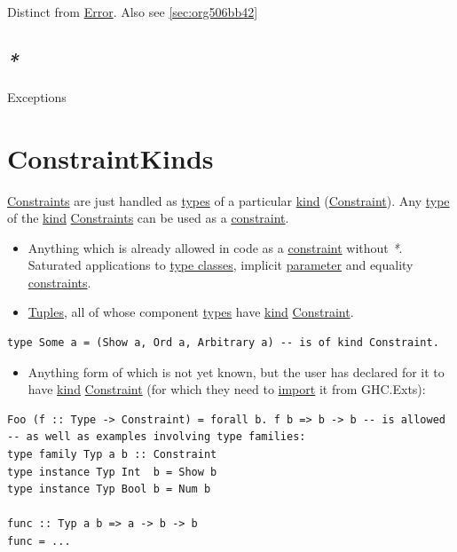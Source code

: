 \documentclass[a4paper,14pt,oneside]{book}
\begin{document}
Distinct from \hyperref[org5ce5059]{Error}. Also see \ref{sec:org506bb42}

\section{\emph{*}}
\label{sec:org059222b}

\label{org2242ef1}Exceptions

\chapter{\label{org9f13edb}ConstraintKinds}
\label{sec:org8cd489f}
\hyperref[org02cc92c]{Constraints} are just handled as \hyperref[orgfd19782]{types} of a particular \hyperref[org0d72dae]{kind} (\hyperref[org4cdc852]{Constraint}).
Any \hyperref[org1e4917d]{type} of the \hyperref[org0d72dae]{kind} \hyperref[org02cc92c]{Constraints} can be used as a \hyperref[org4cdc852]{constraint}.
\begin{itemize}
\item Anything which is already allowed in code as a \hyperref[org4cdc852]{constraint} without \emph{*}. Saturated applications to \hyperref[org529e353]{type classes}, implicit \hyperref[org8b63243]{parameter} and equality \hyperref[org02cc92c]{constraints}.
\item \hyperref[org5b6e9ba]{Tuples}, all of whose component \hyperref[orgfd19782]{types} have \hyperref[org0d72dae]{kind} \hyperref[org4cdc852]{Constraint}.
\end{itemize}
\begin{verbatim}
type Some a = (Show a, Ord a, Arbitrary a) -- is of kind Constraint.
\end{verbatim}
\begin{itemize}
\item Anything form of which is not yet known, but the user has declared for it to have \hyperref[org0d72dae]{kind} \hyperref[org4cdc852]{Constraint} (for which they need to \hyperref[org69064d9]{import} it from GHC.Exts):
\end{itemize}
\begin{verbatim}
Foo (f :: Type -> Constraint) = forall b. f b => b -> b -- is allowed
-- as well as examples involving type families:
type family Typ a b :: Constraint
type instance Typ Int  b = Show b
type instance Typ Bool b = Num b

func :: Typ a b => a -> b -> b
func = ...
\end{verbatim}
\end{document}
